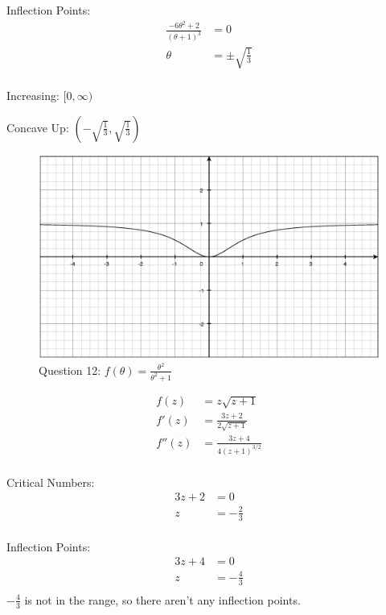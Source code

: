 \documentclass[fleqn]{exam}
\begin{document}
\begin{description}
Inflection Points:
\begin{align*}
  \frac{-6 \theta^2 + 2}{(\theta + 1)^3} &= 0 \\
  \theta &= \pm \sqrt{ \frac{1}{3} } \\
\end{align*}

\begin{itemize*}
  \item Increasing: $[0, \infty)$
  \item Concave Up: $\left( -\sqrt{\frac{1}{3}}, \sqrt{\frac{1}{3}} \right)$
\end{itemize*}

\begin{figure}[H]
  \centering
  \includegraphics[scale=.3]{4.7.12.eps}
  \caption*{Question 12: $f(\theta) = \frac{\theta^2}{\theta^2 + 1}$}
\end{figure}


\item[16]
\begin{align*}
  f(z) &= z \sqrt{z + 1} \\
  f'(z) &= \frac{3z + 2}{2 \sqrt{z + 1}} \\
  f''(z) &=  \frac{3z + 4}{4 (z + 1)^{3/2}} \\
\end{align*}

Critical Numbers:
\begin{align*}
  3z + 2 &= 0 \\
  z &= -\frac{2}{3} \\
\end{align*}

Inflection Points:
\begin{align*}
  3z + 4 &= 0 \\
  z &= - \frac{4}{3} \\
\end{align*}
$-\frac{4}{3}$ is not in the range, so there aren't any inflection points.


\end{description}
\end{document}
